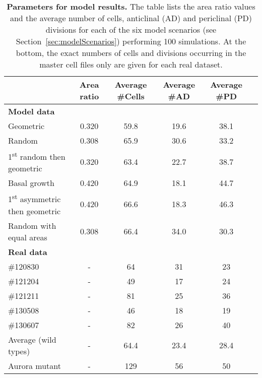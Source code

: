 \documentclass[11pt,a4paper, final]{article}
\begin{document}
%
\clearpage
%
\begin{table}\centering
\begin{tabular}{@{}lccccc@{}}\toprule
& Area ratio & Average \#Cells & Average \#AD & Average \#PD\\ \midrule
\textbf{Model data}\\
Geometric & 0.320 & 59.8 & 19.6 & 38.1\\
Random & 0.308 & 65.9 & 30.6 & 33.2\\
1\textsuperscript{st} random then geometric & 0.320 & 63.4 & 22.7 & 38.7\\
Basal growth & 0.420 & 64.9 & 18.1 & 44.7\\
1\textsuperscript{st} asymmetric then geometric & 0.420 & 66.6 & 18.3 & 46.3\\
Random with equal areas & 0.308 & 66.4 & 34.0 & 30.3\\
\textbf{Real data}\\
\#120830 & - & 64 & 31 & 23\\
\#121204 & - & 49 & 17 & 24\\
\#121211 & - & 81 & 25 & 36\\
\#130508 & - & 46 & 18 & 19\\
\#130607 & - & 82 & 26 & 40\\
Average (wild types) & - & 64.4 & 23.4 & 28.4\\
Aurora mutant & - & 129 & 56 & 50\\
\bottomrule
\end{tabular}
	\caption[Parameters for model results.]{\textbf{Parameters for model results.} The table lists the area ratio values and the average number of cells, anticlinal (AD) and periclinal (PD) divisions for each of the six model scenarios (see Section~\ref{sec:modelScenarios}) performing 100 simulations. At the bottom, the exact numbers of cells and divisions occurring in the master cell files only are given for each real dataset.
	}
	\label{tab:modelParameters}
\end{table}
\end{document}
